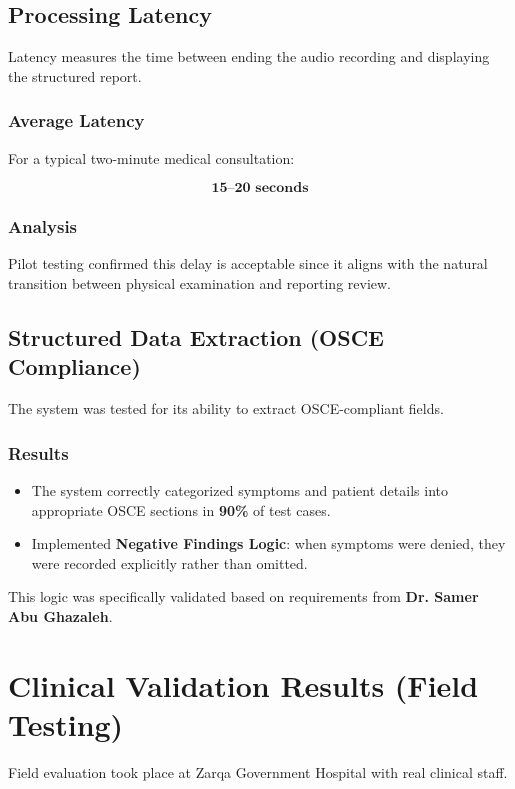 \subsection{Processing Latency}
\label{sec:results:latency}

Latency measures the time between ending the audio recording and displaying the structured 
report.

\subsubsection*{Average Latency}
For a typical two-minute medical consultation:

\[
\textbf{15–20 seconds}
\]

\subsubsection*{Analysis}
Pilot testing confirmed this delay is acceptable since it aligns with the natural transition 
between physical examination and reporting review.

\subsection{Structured Data Extraction (OSCE Compliance)}
\label{sec:results:osce}

The system was tested for its ability to extract OSCE-compliant fields.

\subsubsection*{Results}
\begin{itemize}
    \item The system correctly categorized symptoms and patient details into appropriate OSCE sections in \textbf{90\%} of test cases.
    \item Implemented \textbf{Negative Findings Logic}: when symptoms were denied, they were recorded explicitly rather than omitted.
\end{itemize}

This logic was specifically validated based on requirements from  
\textbf{Dr. Samer Abu Ghazaleh}.

\section{Clinical Validation Results (Field Testing)}
Field evaluation took place at Zarqa Government Hospital with real clinical staff.

